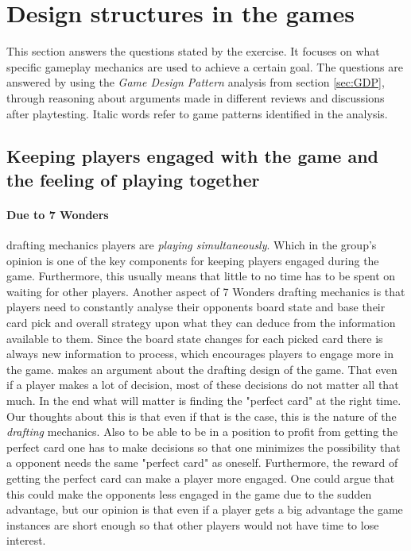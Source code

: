 \documentclass[a4paper]{article}
\begin{document}
\section{Design structures in the games}
This section answers the questions stated by the exercise. It focuses on what specific gameplay mechanics are used to achieve a certain goal.
The questions are answered by using the \textit{Game Design Pattern} analysis from section \ref{sec:GDP}, through reasoning about arguments made in different reviews and discussions after playtesting. Italic words refer to game patterns identified in the analysis.

\subsection{Keeping players engaged with the game and the feeling of playing together}
\paragraph{Due to 7 Wonders} drafting mechanics players are \textit{playing simultaneously}. Which in the group's opinion is one of the key components for keeping players engaged during the game. Furthermore, this usually means that little to no time has to be spent on waiting for other players. Another aspect of 7 Wonders drafting mechanics is that players need to constantly analyse their opponents board state and base their card pick and overall strategy upon what they can deduce from the information available to them. Since the board state changes for each picked card there is always new information to process, which encourages players to engage more in the game.
 makes an argument about the drafting design of the game.
That even if a player makes a lot of decision, most of these decisions do not matter all that much. 
In the end what will matter is finding the "perfect card" at the right time.
Our thoughts about this is that even if that is the case, this is the nature of the \textit{drafting} mechanics.
Also to be able to be in a position to profit from getting the perfect card one has to make decisions so that one minimizes the possibility that a opponent needs the same "perfect card" as oneself.
Furthermore, the reward of getting the perfect card can make a player more engaged. One could argue that this could make the opponents less engaged in the game due to the sudden advantage, but our opinion is that even if a player gets a big advantage the game instances are short enough so that other players would not have time to lose interest.  
\end{document}
